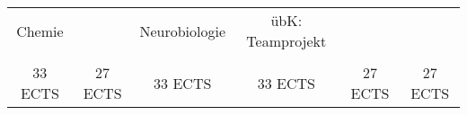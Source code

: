 \begin{table}[htbp]
{\begin{tabular}{|cccccc|}
\multicolumn{1}{|c|}{Chemie}          & \multicolumn{1}{c|}{}              & \multicolumn{1}{c|}{Neurobiologie}  & \multicolumn{1}{c|}{übK: Teamprojekt} & \multicolumn{1}{c|}{}                &                 \\
\multicolumn{1}{|c|}{}                & \multicolumn{1}{c|}{}              & \multicolumn{1}{c|}{}               & \multicolumn{1}{c|}{}                 & \multicolumn{1}{c|}{}                &                 \\ \hline
33 ECTS                               & 27 ECTS                            & 33 ECTS                             & 33 ECTS                               & 27 ECTS                              & 27 ECTS         \\ \hline
\end{tabular}}
\end{table}
